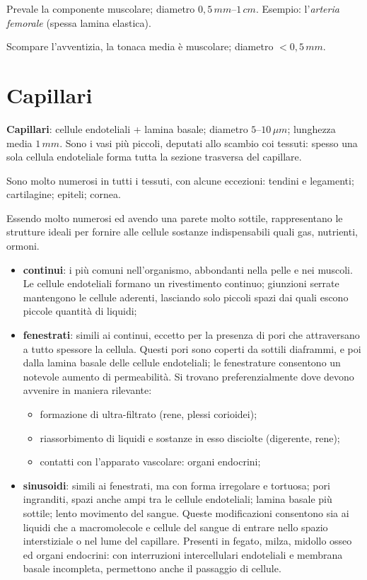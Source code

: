 Prevale la componente muscolare; diametro $0,5\,mm$--$1\,cm$. Esempio: l'\textit{arteria
femorale} (spessa lamina elastica).

Scompare l'avventizia, la tonaca media è muscolare; diametro $< 0,5\,mm$.

\section{Capillari}

\textbf{Capillari}: cellule endoteliali + lamina basale; diametro $5$--$10\,\mu m$; lunghezza
media $1\,mm$. Sono i vasi più piccoli, deputati allo scambio coi tessuti: spesso una sola cellula
endoteliale forma tutta la sezione trasversa del capillare.

Sono molto numerosi in tutti i tessuti, con alcune eccezioni: tendini e legamenti; cartilagine;
epiteli; cornea.

Essendo molto numerosi ed avendo una parete molto sottile, rappresentano le strutture ideali per
fornire alle cellule sostanze indispensabili quali gas, nutrienti, ormoni.

\begin{itemize}
  \item \textbf{continui}: i più comuni nell'organismo, abbondanti nella pelle e nei muscoli. Le
    cellule endoteliali formano un rivestimento continuo; giunzioni serrate mantengono le cellule
    aderenti, lasciando solo piccoli spazi dai quali escono piccole quantità di liquidi;
  \item \textbf{fenestrati}: simili ai continui, eccetto per la presenza di pori che attraversano
    a tutto spessore la cellula. Questi pori sono coperti da sottili diaframmi, e poi dalla lamina
    basale delle cellule endoteliali; le fenestrature consentono un notevole aumento di
    permeabilità. Si trovano preferenzialmente dove devono avvenire in maniera rilevante:
    \begin{itemize}
      \item formazione di ultra-filtrato (rene, plessi corioidei);
      \item riassorbimento di liquidi e sostanze in esso disciolte (digerente, rene);
      \item contatti con l'apparato vascolare: organi endocrini;
    \end{itemize}
  \item \textbf{sinusoidi}: simili ai fenestrati, ma con forma irregolare e tortuosa; pori
    ingranditi, spazi anche ampi tra le cellule endoteliali; lamina basale più sottile; lento
    movimento del sangue. Queste modificazioni consentono sia ai liquidi che a macromolecole e
    cellule del sangue di entrare nello spazio interstiziale o nel lume del capillare. Presenti in
    fegato, milza, midollo osseo ed organi endocrini: con interruzioni intercellulari endoteliali
    e membrana basale incompleta, permettono anche il passaggio di cellule.
\end{itemize}

